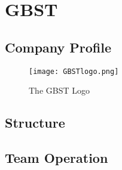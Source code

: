 \chapter{GBST}

\section{Company Profile}

\vspace{0.5cm}
\begin{figure}[ht!]
\centering
\texttt{[image: GBSTlogo.png]}
\caption{The GBST Logo \cite{gbstlogo}}
\label{gbstlogo}
\end{figure}

\section{Structure}

\section{Team Operation}

\begin{comment}

lorem ipsum blah blah blah

Figure \ref{gbstlogo} in text

Citing \cite{gbstlogo} in text

\vspace{0.5cm}
\begin{figure}[ht!]
\centering
\texttt{[image: GBSTlogo.png]}
\caption{The GBST Logo \cite{gbstlogo}}
\label{gbstlogo}
\end{figure}

\end{comment}

\begin{comment}
\texttt{[image: GBSTlogo.png]}
\end{comment}
